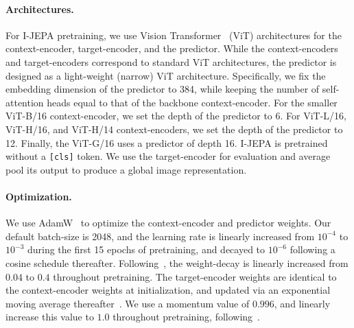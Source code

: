\documentclass[10pt,twocolumn,letterpaper]{article}
\newcommand{\putalg}{{I-JEPA}\xspace}
\begin{document}
\paragraph{Architectures.}
For \putalg pretraining, we use Vision Transformer~\cite{dosovitskiy2020image} (ViT) architectures for the context-encoder, target-encoder, and the predictor.
While the context-encoders and target-encoders correspond to standard ViT architectures, the predictor is designed as a light-weight (narrow) ViT architecture.
Specifically, we fix the embedding dimension of the predictor to 384, while keeping the number of self-attention heads equal to that of the backbone context-encoder.
For the smaller ViT-B/16 context-encoder, we set the depth of the predictor to 6.
For ViT-L/16, ViT-H/16, and ViT-H/14 context-encoders, we set the depth of the predictor to 12. Finally, the ViT-G/16 uses a predictor of depth 16.
\putalg is pretrained without a {\tt [cls]} token. We use the target-encoder for evaluation and average pool its output to produce a global image representation.

\paragraph{Optimization.}
We use AdamW~\cite{loshchilov2017decoupled} to optimize the context-encoder and predictor weights.
Our default batch-size is 2048, and the learning rate is linearly increased from $10^{-4}$ to $10^{-3}$ during the first 15 epochs of pretraining, and decayed to $10^{-6}$ following a cosine schedule thereafter.
Following~\cite{caron2021emerging, assran2022masked}, the weight-decay is linearly increased from $0.04$ to $0.4$ throughout pretraining.
The target-encoder weights are identical to the context-encoder weights at initialization, and updated via an exponential moving average thereafter~\cite{tarvainen2017mean,he2019moco,chen2020mocov2,grill2020bootstrap,caron2021emerging,assran2022masked}.
We use a momentum value of $0.996$, and linearly increase this value to $1.0$ throughout pretraining, following~\cite{caron2021emerging, assran2022masked}.
\end{document}
